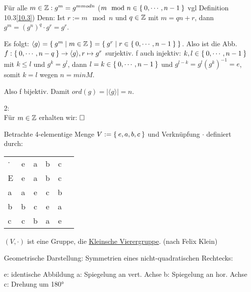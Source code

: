 \documentclass{../../meta/tudscript}
\begin{document}

            Für alle $m \in \mathbb{Z}: g^m = g^{m mod n}$ ($m \mod n \in \Set{0, \cdots, n-1}$ vgl Definition 10.3\ref{10.3})
            Denn: Ist $r := m \mod n$ und $q \in \mathbb{Z}$ mit $m = qn + r$, dann $g^m = (g^n)^q \cdot g^r = g^r$.

            Es folgt: $\langle g \rangle = \Set{g^m \mid m \in \mathbb{Z}} = \Set{g^r \mid r \in \Set{0, \cdots, n-1}}$.
            Also ist die Abb. $f: \Set{0, \cdots, n-q} \rightarrow \langle g \rangle, r \mapsto g^r$ surjektiv. 
            f auch injektiv: $k,l \in \Set{0, \cdots, n-1}$ mit $k \leq l$ und $g^k = g^l$, dann $l = k \in \Set{0, \cdots, n-1}$ 
            und $g^{l-k} = g^l (g^k)^{-1} = e$, somit $k = l$ wegen $n = min M$.
            
            Also f bijektiv. Damit $ord(g) = | \langle g \rangle | = n$.
            
            
            2:\\
            Für $m \in \mathbb{Z}$ erhalten wir:
            $\hfill\square$

            Betrachte 4-elementige Menge $V := \Set{e, a, b, c}$ und Verknüpfung $\cdot$ definiert durch:
            \begin{tabular}{l c c c c r}
            $\cdot$ & e & a & b & c \\
            E & e & a & b & c \\
            a & a & e & c & b \\
            b & b & c & e & a \\
            c & c & b & a & e \\
            \end{tabular}
            $(V, \cdot)$ ist eine Gruppe, die \underline{Kleinsche Vierergruppe}. (nach Felix Klein)

            Geometrische Darstellung: Symmetrien eines nicht-quadratischen Rechtecks:
            \begin{center}
            \end{center}
            
            e: identische Abbildung
            a: Spiegelung an vert. Achse
            b: Spiegelung an hor. Achse
            c: Drehung um 180° 
\end{document}
